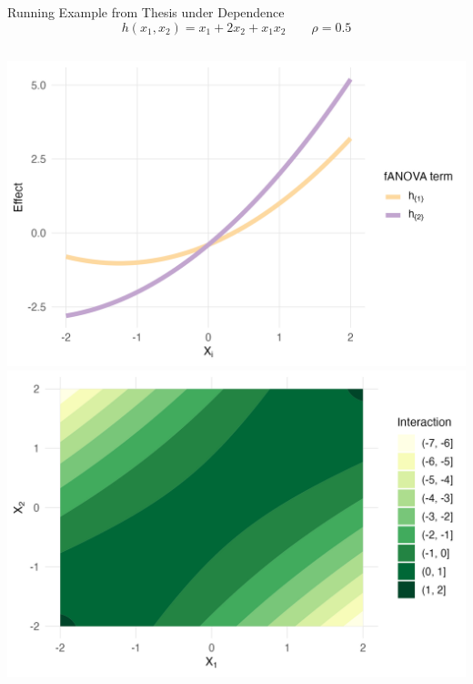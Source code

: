 \begin{frame}{Running Example from Thesis under Dependence}
\begin{equation}
  h(x_1, x_2) = x_1 + 2 x_2 + x_1 x_2 \qquad \rho = 0.5
\end{equation}
    \begin{columns}
      \includegraphics[width=\linewidth]{../images/experiment_section/running_example_a1p10_a2p20_a11p00_a22p00_a12p10_rhop05_main.png}
      \includegraphics[width=\linewidth]{../images/experiment_section/running_example_a1p10_a2p20_a11p00_a22p00_a12p10_rhop05_interaction.png}
  \end{columns}
\end{frame}

